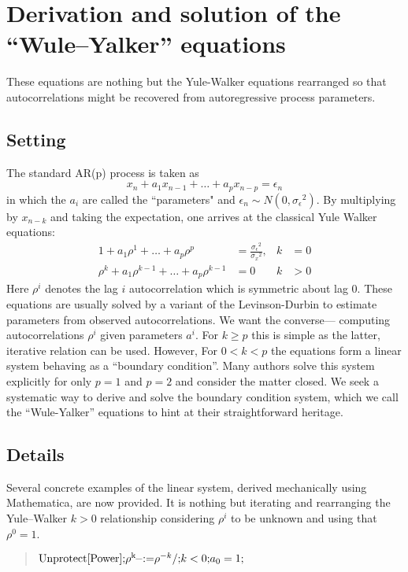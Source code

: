 \documentclass[12pt,letterpaper]{article}
\begin{document}
\section*{Derivation and solution of the ``Wule--Yalker'' equations}

These equations are nothing but the Yule-Walker equations rearranged so that
autocorrelations might be recovered from autoregressive process parameters.

\subsection*{Setting}

The standard AR(p) process is taken as
\[
x_n+a_1x_{n-1}+\dots+a_px_{n-p}=\epsilon _n
\]
in which the \(a_i\) are called the ``parameters" and \(\epsilon _n\sim
N\left(0,\sigma _{\epsilon }{}^2\right)\). By multiplying by \(x_{n-k}\) and
taking the expectation, one arrives at the classical Yule Walker equations:
\begin{align*}
1+a_1\rho ^1+\dots+a_p\rho ^p &= \frac{\sigma _{\epsilon }{}^2}{\sigma _x{}^2},
&
k&=0
\\
\rho ^k+a_1\rho ^{k-1}+\dots+a_p\rho ^{k-1}&=0
&
k &> 0
\end{align*}
Here $\rho^i$ denotes the lag $i$ autocorrelation which is symmetric about lag
$0$. These equations are usually solved by a variant of the Levinson-Durbin to
estimate parameters from observed autocorrelations. We want the converse---
computing autocorrelations $\rho^i$ given parameters $a^i$.  For $k\geq p$ this
is simple as the latter, iterative relation can be used. However, For $0<k<p$
the equations form a linear system behaving as a ``boundary condition''.  Many
authors solve this system explicitly for only $p=1$ and $p=2$ and consider the
matter closed.  We seek a systematic way to derive and solve the boundary
condition system, which we call the ``Wule-Yalker'' equations to hint at their
straightforward heritage.

\subsection*{Details}

Several concrete examples of the linear system, derived mechanically using
Mathematica, are now provided. It is nothing but iterating and rearranging the
Yule--Walker $k>0$ relationship considering $\rho ^i$ to be unknown and using
that $\rho^0=1$.

\begin{quote}
\noindent\({\text{Unprotect}[\text{Power}];}\\
{\rho ^{\text{k$\_$}}\text{:=}\rho ^{-k}\text{/;}k<0;}\\
{a_0=1;}\)
\end{quote}
\end{document}

